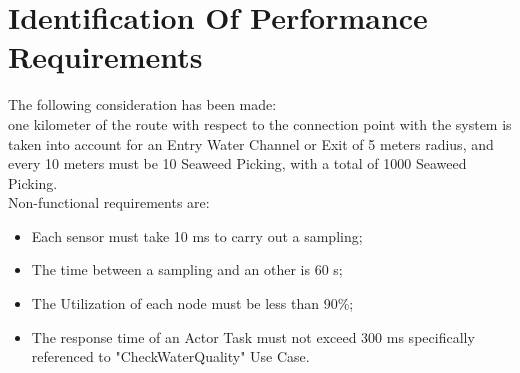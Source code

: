 \chapter{\textbf{Identification Of Performance Requirements}}


The following consideration has been made: \\
one kilometer of the route with respect to the connection point with the system is taken into account for an Entry Water Channel or Exit of 5 meters radius, and every 10 meters must be 10 Seaweed Picking, with a total of 1000 Seaweed Picking. \\
Non-functional requirements are:
\begin{itemize} 
	\item Each sensor must take 10 ms to carry out a sampling;
		\item The time between a sampling and an other is 60 s;
	\item The Utilization of each node must be less than 90\%;
	\item The response time of an Actor Task must not exceed 300 ms specifically referenced to "CheckWaterQuality" Use Case.
\end{itemize} 
